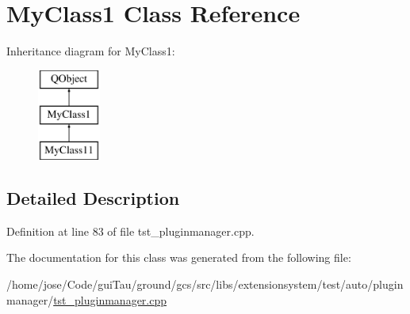 \hypertarget{class_my_class1}{\section{My\-Class1 Class Reference}
\label{class_my_class1}
}
Inheritance diagram for My\-Class1\-:\begin{figure}[H]
\begin{center}
\leavevmode
\includegraphics[height=3.000000cm]{class_my_class1}
\end{center}
\end{figure}


\subsection{Detailed Description}


Definition at line 83 of file tst\-\_\-pluginmanager.\-cpp.



The documentation for this class was generated from the following file\-:\begin{DoxyCompactItemize}
\item 
/home/jose/\-Code/gui\-Tau/ground/gcs/src/libs/extensionsystem/test/auto/pluginmanager/\hyperlink{tst__pluginmanager_8cpp}{tst\-\_\-pluginmanager.\-cpp}\end{DoxyCompactItemize}
